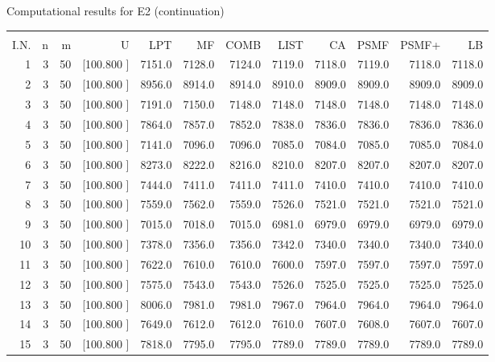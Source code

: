 \documentclass[12pt,a4paper]{article}
\begin{document}
\begin{center}
 Computational results for E2 (continuation) {\tiny
\begin{tabular}{r r r r r r r r r r r r}\hline
    &   &   &          &        &        &        &        &        &        &        &       \\[-0.1in]
  I.N.  &  n  &  m  &  U  &  LPT  &  MF  &  COMB  &  LIST  &  CA  & PSMF &PSMF+ & LB \\[0.03in]
\hline
   1&  3& 50&[100.800   ]&  7151.0&  7128.0&  7124.0&  7119.0&  7118.0&  7119.0&  7118.0&  7118.0\\[-0.02in]
   2&  3& 50&[100.800   ]&  8956.0&  8914.0&  8914.0&  8910.0&  8909.0&  8909.0&  8909.0&  8909.0\\[-0.02in]
   3&  3& 50&[100.800   ]&  7191.0&  7150.0&  7148.0&  7148.0&  7148.0&  7148.0&  7148.0&  7148.0\\[-0.02in]
   4&  3& 50&[100.800   ]&  7864.0&  7857.0&  7852.0&  7838.0&  7836.0&  7836.0&  7836.0&  7836.0\\[-0.02in]
   5&  3& 50&[100.800   ]&  7141.0&  7096.0&  7096.0&  7085.0&  7084.0&  7085.0&  7085.0&  7084.0\\[-0.02in]
   6&  3& 50&[100.800   ]&  8273.0&  8222.0&  8216.0&  8210.0&  8207.0&  8207.0&  8207.0&  8207.0\\[-0.02in]
   7&  3& 50&[100.800   ]&  7444.0&  7411.0&  7411.0&  7411.0&  7410.0&  7410.0&  7410.0&  7410.0\\[-0.02in]
   8&  3& 50&[100.800   ]&  7559.0&  7562.0&  7559.0&  7526.0&  7521.0&  7521.0&  7521.0&  7521.0\\[-0.02in]
   9&  3& 50&[100.800   ]&  7015.0&  7018.0&  7015.0&  6981.0&  6979.0&  6979.0&  6979.0&  6979.0\\[-0.02in]
  10&  3& 50&[100.800   ]&  7378.0&  7356.0&  7356.0&  7342.0&  7340.0&  7340.0&  7340.0&  7340.0\\[-0.02in]
  11&  3& 50&[100.800   ]&  7622.0&  7610.0&  7610.0&  7600.0&  7597.0&  7597.0&  7597.0&  7597.0\\[-0.02in]
  12&  3& 50&[100.800   ]&  7575.0&  7543.0&  7543.0&  7526.0&  7525.0&  7525.0&  7525.0&  7525.0\\[-0.02in]
  13&  3& 50&[100.800   ]&  8006.0&  7981.0&  7981.0&  7967.0&  7964.0&  7964.0&  7964.0&  7964.0\\[-0.02in]
  14&  3& 50&[100.800   ]&  7649.0&  7612.0&  7612.0&  7610.0&  7607.0&  7608.0&  7607.0&  7607.0\\[-0.02in]
  15&  3& 50&[100.800   ]&  7818.0&  7795.0&  7795.0&  7789.0&  7789.0&  7789.0&  7789.0&  7789.0\\[-0.02in]

\end{tabular}}
\end{center}
\end{document}
